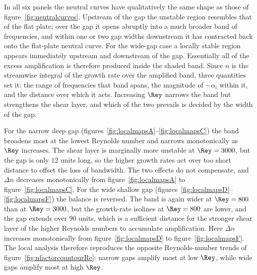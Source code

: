 \documentclass[lineno]{jfm}
\begin{document}
In all six panels the neutral curves have qualitatively the same shape as those of figure~\ref{fig:neutralcurves}. Upstream of the gap the unstable region resembles that of the flat plate; over the gap it opens abruptly into a much broader band of frequencies, and within one or two gap widths downstream it has contracted back onto the flat-plate neutral curve. For the wide-gap case a locally stable region appears immediately upstream and downstream of the gap. Essentially all of the excess amplification is therefore produced inside the shaded band. Since $n$ is the streamwise integral of the growth rate over the amplified band, three quantities set it: the range of frequencies that band spans, the magnitude of $-\alpha_\mathrm{i}$ within it, and the distance over which it acts. Increasing $\Rey$ narrows the band but strengthens the shear layer, and which of the two prevails is decided by the width of the gap.

For the narrow deep gap (figures~\ref{fig:localmapsA}--\ref{fig:localmapsC}) the band broadens most at the lowest Reynolds number and narrows monotonically as $\Rey$ increases. The shear layer is marginally more unstable at $\Rey=3000$, but the gap is only $12$ units long, so the higher growth rates act over too short distance to offset the loss of bandwidth. The two effects do not compensate, and $\Delta n$ decreases monotonically from figure~\ref{fig:localmapsA} to figure~\ref{fig:localmapsC}. For the wide shallow gap (figures~\ref{fig:localmapsD}--\ref{fig:localmapsF}) the balance is reversed. The band is again wider at $\Rey=800$ than at $\Rey=3000$, but the growth-rate isolines at $\Rey=800$ are lower, and the gap extends over $90$ units, which is a sufficient distance for the stronger shear layer of the higher Reynolds numbers to accumulate amplification. Here $\Delta n$ increases monotonically from figure~\ref{fig:localmapsD} to figure~\ref{fig:localmapsF}. The local analysis therefore reproduces the opposite Reynolds-number trends of figure~\ref{fig:nfactorcountourRe}: narrow gaps amplify most at low $\Rey$, while wide gaps amplify most at high $\Rey$.
\end{document}
